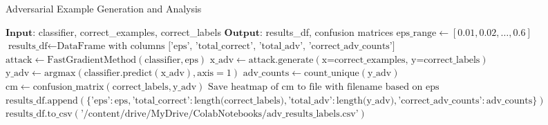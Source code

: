 \documentclass[11pt,onside]{article}
\begin{document}
\begin{algorithm}[H]
\caption{Adversarial Example Generation and Analysis}
\begin{algorithmic}[1]
\State $\textbf{Input:}$ classifier, correct\_examples, correct\_labels
\State $\textbf{Output:}$ results\_df, confusion matrices
\State $\text{eps\_range} \gets [0.01, 0.02, \ldots, 0.6]$
\State $\text{results\_df} \gets \text{DataFrame with columns ['eps', 'total\_correct', 'total\_adv', 'correct\_adv\_counts']}$
    \State $\text{attack} \gets \text{FastGradientMethod}(\text{classifier}, \text{eps})$
    \State $\text{x\_adv} \gets \text{attack.generate}(\text{x=correct\_examples, y=correct\_labels})$
    \State $\text{y\_adv} \gets \text{argmax}(\text{classifier.predict}(\text{x\_adv}), \text{axis}=1)$
    \State $\text{adv\_counts} \gets \text{count\_unique}(\text{y\_adv})$
    \State $\text{cm} \gets \text{confusion\_matrix}(\text{correct\_labels}, \text{y\_adv})$
    \State $\text{Save heatmap of cm to file with filename based on eps}$
    \State $\text{results\_df.append}(\{\text{'eps'}: \text{eps}, \text{'total\_correct'}: \text{length(correct\_labels)}, \text{'total\_adv'}: \text{length(y\_adv)}, \text{'correct\_adv\_counts'}: \text{adv\_counts}\})$
\EndFor
\State $\text{results\_df.to\_csv}(\text{'/content/drive/MyDrive/ColabNotebooks/adv\_results\_labels.csv'})$
\end{algorithmic}
\end{algorithm}
\end{document}
